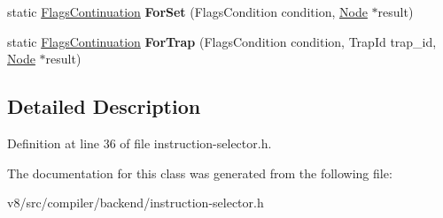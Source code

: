 \begin{DoxyCompactItemize}
\item 
\mbox{\label{classv8_1_1internal_1_1compiler_1_1FlagsContinuation_a0bd7756ff7515a8408f8dd1f85cdf75e}} 
static \mbox{\hyperlink{classv8_1_1internal_1_1compiler_1_1FlagsContinuation}{Flags\+Continuation}} {\bfseries For\+Set} (Flags\+Condition condition, \mbox{\hyperlink{classv8_1_1internal_1_1compiler_1_1Node}{Node}} $\ast$result)
\item 
\mbox{\label{classv8_1_1internal_1_1compiler_1_1FlagsContinuation_acdc477acffca0d0206e9af4adb5f19f1}} 
static \mbox{\hyperlink{classv8_1_1internal_1_1compiler_1_1FlagsContinuation}{Flags\+Continuation}} {\bfseries For\+Trap} (Flags\+Condition condition, Trap\+Id trap\+\_\+id, \mbox{\hyperlink{classv8_1_1internal_1_1compiler_1_1Node}{Node}} $\ast$result)
\end{DoxyCompactItemize}


\subsection{Detailed Description}


Definition at line 36 of file instruction-\/selector.\+h.



The documentation for this class was generated from the following file\+:\begin{DoxyCompactItemize}
\item 
v8/src/compiler/backend/instruction-\/selector.\+h\end{DoxyCompactItemize}
